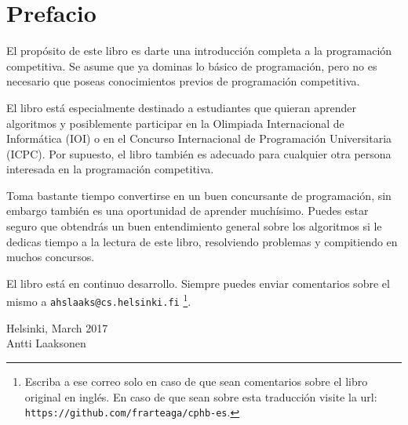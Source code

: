 \chapter*{Prefacio}

El prop\'osito de este libro es darte
una introducci\'on completa a la programaci\'on competitiva.
Se asume que ya dominas lo b\'asico de programaci\'on, pero no
es necesario que poseas conocimientos previos de programaci\'on
competitiva.

El libro est\'a especialmente destinado a estudiantes que
quieran aprender algoritmos y posiblemente participar en
la Olimpiada Internacional de Inform\'atica (IOI) o en el
Concurso Internacional de Programaci\'on Universitaria (ICPC).
Por supuesto, el libro tambi\'en es adecuado para
cualquier otra persona interesada en la programaci\'on 
competitiva.

Toma bastante tiempo convertirse en un buen concursante de
programaci\'on, sin embargo tambi\'en es una oportunidad de
aprender much\'isimo. Puedes estar seguro que obtendr\'as un
buen entendimiento general sobre los algoritmos si le
dedicas tiempo a la lectura de este libro, resolviendo
problemas y compitiendo en muchos concursos.

El libro est\'a en continuo desarrollo. Siempre
puedes enviar comentarios sobre el mismo
a \texttt{ahslaaks@cs.helsinki.fi} \footnote{Escriba a ese
correo solo en caso de que sean comentarios sobre el
libro original en ingl\'es. En caso de que sean sobre esta
traducci\'on visite la url: \texttt{https://github.com/frarteaga/cphb-es}.}.

\begin{flushright}
Helsinki, March 2017 \\
Antti Laaksonen
\end{flushright}

